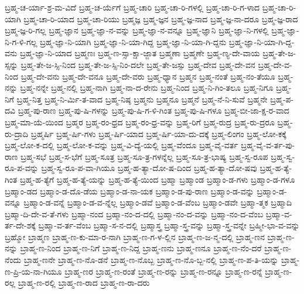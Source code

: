 {ಬ್ರಹ್ಮ-ಚ-ರ್ಯಾ-ಶ್ರ-ಮ-ವಿದೆ
ಬ್ರಹ್ಮ-ಚ-ರ್ಯೆಗೆ
ಬ್ರಹ್ಮ-ಚಾರಿ
ಬ್ರಹ್ಮ-ಚಾ-ರಿ-ಗಳಲ್ಲಿ
ಬ್ರಹ್ಮ-ಚಾ-ರಿ-ಗ-ಳಾದ
ಬ್ರಹ್ಮ-ಚಾ-ರಿ-ಯಾಗಿ
ಬ್ರಹ್ಮ-ಚಾ-ರಿ-ಯಾದ
ಬ್ರಹ್ಮ-ಚಾ-ರಿಯು
ಬ್ರಹ್ಮಜ್ಞ
ಬ್ರಹ್ಮ-ಜ್ಞನ
ಬ್ರಹ್ಮ-ಜ್ಞ-ನಾದ
ಬ್ರಹ್ಮ-ಜ್ಞ-ನಾ-ದರೂ
ಬ್ರಹ್ಮ-ಜ್ಞ-ರಾದ
ಬ್ರಹ್ಮ-ಜ್ಞ-ರಿ-ಗಲ್ಲ
ಬ್ರಹ್ಮ-ಜ್ಞಾನ
ಬ್ರಹ್ಮ-ಜ್ಞಾ-ನ-ವನ್ನು
ಬ್ರಹ್ಮ-ಜ್ಞಾ-ನ-ವನ್ನೂ
ಬ್ರಹ್ಮ-ಜ್ಞಾನಿ
ಬ್ರಹ್ಮ-ಜ್ಞಾ-ನಿ-ಗಳಲ್ಲಿ
ಬ್ರಹ್ಮ-ಜ್ಞಾ-ನಿ-ಗ-ಳಿ-ಗಲ್ಲ
ಬ್ರಹ್ಮ-ಜ್ಞಾ-ನಿ-ಯಾಗಿ
ಬ್ರಹ್ಮ-ಜ್ಞಾ-ನಿ-ಯಾ-ಗಿದ್ದ
ಬ್ರಹ್ಮ-ಜ್ಞಾ-ನಿ-ಯಾ-ಗಿ-ದ್ದನು
ಬ್ರಹ್ಮ-ಜ್ಞಾ-ನಿ-ಯಾ-ಗಿ-ದ್ದ-ವನು
ಬ್ರಹ್ಮ-ಜ್ಞಾ-ನಿ-ಯಾದ
ಬ್ರಹ್ಮಣಃ
ಬ್ರಹ್ಮ-ಣ-ಸ್ಸಾ-ಕ್ಷಾ-ಜ್ಜಾತ
ಬ್ರಹ್ಮಣಾ
ಬ್ರಹ್ಮಣೇ
ಬ್ರಹ್ಮ-ಣ್ಯ-ದೇ-ವಾಯ
ಬ್ರಹ್ಮ-ತೇ-ಜ-ಸ್ಸನ್ನು
ಬ್ರಹ್ಮ-ತೇ-ಜ-ಸ್ಸಿ-ನಿಂದ
ಬ್ರಹ್ಮ-ತೇ-ಜ-ಸ್ಸಿ-ನಿಂ-ದಲೇ
ಬ್ರಹ್ಮ-ತೇ-ಜಸ್ಸು
ಬ್ರಹ್ಮ-ದೇವ
ಬ್ರಹ್ಮ-ದೇ-ವನ
ಬ್ರಹ್ಮ-ದೇ-ವ-ನಿಂದ
ಬ್ರಹ್ಮ-ದೇ-ವನು
ಬ್ರಹ್ಮ-ದೇ-ವನೂ
ಬ್ರಹ್ಮ-ದೇ-ವರು
ಬ್ರಹ್ಮ-ಧ್ಯಾನ
ಬ್ರಹ್ಮನ
ಬ್ರಹ್ಮ-ನಂತೆ
ಬ್ರಹ್ಮ-ನಂ-ತೆಯೂ
ಬ್ರಹ್ಮ-ನನ್ನು
ಬ್ರಹ್ಮ-ನನ್ನೇ
ಬ್ರಹ್ಮ-ನಲ್ಲಿ
ಬ್ರಹ್ಮ-ನಾಗಿ
ಬ್ರಹ್ಮ-ನಾ-ದ-ರೇನು
ಬ್ರಹ್ಮ-ನಿಂದ
ಬ್ರಹ್ಮ-ನಿ-ಗಿಂ-ತಲೂ
ಬ್ರಹ್ಮ-ನಿಗೂ
ಬ್ರಹ್ಮ-ನಿಗೆ
ಬ್ರಹ್ಮ-ನಿತ್ತ
ಬ್ರಹ್ಮ-ನಿ-ರ್ಮಿ-ತ-ವಾದ
ಬ್ರಹ್ಮ-ನಿಷ್ಠ
ಬ್ರಹ್ಮನು
ಬ್ರಹ್ಮನೂ
ಬ್ರಹ್ಮನೆ
ಬ್ರಹ್ಮ-ನೆ-ನಿ-ಸುವೆ
ಬ್ರಹ್ಮನೇ
ಬ್ರಹ್ಮ-ಪ-ದವಿ
ಬ್ರಹ್ಮ-ಪು-ರಾಣ
ಬ್ರಹ್ಮ-ಪು-ಷಿ-ಗಳನ್ನು
ಬ್ರಹ್ಮ-ಪು-ಷಿ-ಗ-ಳಿ-ಗಿಂತ
ಬ್ರಹ್ಮ-ಪು-ಷಿ-ಗಳೂ
ಬ್ರಹ್ಮ-ಬೀ-ಜಾ-ಕ್ಷ-ರ-ವಾದ
ಬ್ರಹ್ಮ-ಮಾ-ಯೆ-ಯಿಂದ
ಬ್ರಹ್ಮರ
ಬ್ರಹ್ಮ-ರಂ-ಧ್ರದ
ಬ್ರಹ್ಮ-ರಂ-ಧ್ರ-ವನ್ನು
ಬ್ರಹ್ಮ-ರಿಗೆ
ಬ್ರಹ್ಮ-ರುದ್ರ
ಬ್ರಹ್ಮ-ರು-ದ್ರರೂ
ಬ್ರಹ್ಮ-ರು-ದ್ರಾದಿ
ಬ್ರಹ್ಮರ್ಷಿ
ಬ್ರಹ್ಮ-ರ್ಷಿ-ಗಳು
ಬ್ರಹ್ಮ-ರ್ಷಿ-ಯಾದ
ಬ್ರಹ್ಮ-ರ್ಷಿ-ಯಾ-ದು-ದಕ್ಕೆ
ಬ್ರಹ್ಮ-ಲಿಂಗಂ
ಬ್ರಹ್ಮ-ಲೋ-ಕಕ್ಕೆ
ಬ್ರಹ್ಮ-ಲೋ-ಕ-ದಲ್ಲಿ
ಬ್ರಹ್ಮ-ಲೋ-ಕ-ವನ್ನು
ಬ್ರಹ್ಮ-ವಿ-ದ್ಯೆ-ಯಲ್ಲಿ
ಬ್ರಹ್ಮ-ವೆಂದೂ
ಬ್ರಹ್ಮ-ವೈ-ವರ್ತ
ಬ್ರಹ್ಮ-ವೈ-ವ-ರ್ತ-ಪು-ರಾಣ
ಬ್ರಹ್ಮ-ಸಭೆ
ಬ್ರಹ್ಮ-ಸ-ಭೆಗೆ
ಬ್ರಹ್ಮ-ಸೂತ್ರ
ಬ್ರಹ್ಮ-ಸೂ-ತ್ರ-ಗಳನ್ನೆಲ್ಲ
ಬ್ರಹ್ಮ-ಸೂ-ತ್ರ-ಭಾಷ್ಯ
ಬ್ರಹ್ಮ-ಸ್ವ-ರೂಪ
ಬ್ರಹ್ಮ-ಸ್ವ-ರೂ-ಪ-ವನ್ನು
ಬ್ರಹ್ಮ-ಸ್ವ-ರೂ-ಪ-ವಾ-ಗಿಯೂ
ಬ್ರಹ್ಮ-ಹ-ತ್ಯಾ-ದೋ-ಷ-ದಿಂದ
ಬ್ರಹ್ಮ-ಹ-ತ್ಯಾ-ದೋ-ಷವು
ಬ್ರಹ್ಮ-ಹ-ತ್ಯೆ-ಗಿಂತ
ಬ್ರಹ್ಮ-ಹ-ತ್ಯೆಗೆ
ಬ್ರಹ್ಮ-ಹ-ತ್ಯೆ-ಯನ್ನು
ಬ್ರಹ್ಮ-ಹ-ತ್ಯೆ-ಯಿಂದ
ಬ್ರಹ್ಮಾ
ಬ್ರಹ್ಮಾಂಡ
ಬ್ರಹ್ಮಾಂ-ಡ-ಗಳು
ಬ್ರಹ್ಮಾಂ-ಡ-ಗಳೂ
ಬ್ರಹ್ಮಾಂ-ಡದ
ಬ್ರಹ್ಮಾಂ-ಡ-ದೊ-ಡೆಯ
ಬ್ರಹ್ಮಾಂ-ಡ-ನಾ-ಯಕ
ಬ್ರಹ್ಮಾಂ-ಡ-ಪು-ರಾಣ
ಬ್ರಹ್ಮಾಂ-ಡ-ವನ್ನು
ಬ್ರಹ್ಮಾಂ-ಡ-ವನ್ನೂ
ಬ್ರಹ್ಮಾಂ-ಡ-ವನ್ನೆ
ಬ್ರಹ್ಮಾಂ-ಡ-ವ-ನ್ನೆಲ್ಲ
ಬ್ರಹ್ಮಾಂ-ಡವೆ
ಬ್ರಹ್ಮಾಂ-ಡ-ವೆಂಬ
ಬ್ರಹ್ಮಾಂ-ಡವೇ
ಬ್ರಹ್ಮಾ-ತ್ಮಕ
ಬ್ರಹ್ಮಾದಿ
ಬ್ರಹ್ಮಾ-ದಿ-ದೇ-ವ-ತೆ-ಗಳು
ಬ್ರಹ್ಮಾ-ನಂದ
ಬ್ರಹ್ಮಾ-ನಂ-ದ-ದಲ್ಲಿ
ಬ್ರಹ್ಮಾ-ನಂ-ದ-ವನ್ನು
ಬ್ರಹ್ಮಾ-ನಂ-ದ-ವೆಂಬ
ಬ್ರಹ್ಮಾ-ವ-ರ್ತ-ದೇ-ಶಕ್ಕೆ
ಬ್ರಹ್ಮಾ-ವ-ರ್ತ-ವೆಂಬ
ಬ್ರಹ್ಮಾ-ಸ-ನ-ದಲ್ಲಿ
ಬ್ರಹ್ಮಾಸ್ತ್ರ
ಬ್ರಹ್ಮಾ-ಸ್ತ್ರ-ವನ್ನು
ಬ್ರಹ್ಮಾ-ಸ್ತ್ರ-ವನ್ನೇ
ಬ್ರಹ್ಮೀ-ಭಾ-ವ-ವನ್ನು
ಬ್ರಹ್ಮೋ
ಬ್ರಾಹ್ಮಣ
ಬ್ರಾಹ್ಮ-ಣ-ಕು-ಮಾ-ರ-ನಾಗಿ
ಬ್ರಾಹ್ಮ-ಣ-ಗ-ಳ-ಲ್ಲಿನ
ಬ್ರಾಹ್ಮ-ಣ-ಜ-ನ್ಮ-ದಲ್ಲಿ
ಬ್ರಾಹ್ಮ-ಣನ
ಬ್ರಾಹ್ಮ-ಣ-ನನ್ನು
ಬ್ರಾಹ್ಮ-ಣ-ನಿಂದ
ಬ್ರಾಹ್ಮ-ಣ-ನಿಗೆ
ಬ್ರಾಹ್ಮ-ಣ-ನಿದ್ದ
ಬ್ರಾಹ್ಮ-ಣನು
ಬ್ರಾಹ್ಮ-ಣನೂ
ಬ್ರಾಹ್ಮ-ಣ-ನೆಂ-ದರೆ
ಬ್ರಾಹ್ಮ-ಣ-ನೆಂದು
ಬ್ರಾಹ್ಮ-ಣನೇ
ಬ್ರಾಹ್ಮ-ಣ-ನೊ-ಡನೆ
ಬ್ರಾಹ್ಮ-ಣ-ನೊಬ್ಬ
ಬ್ರಾಹ್ಮ-ಣ-ನೊ-ಬ್ಬ-ನಲ್ಲಿ
ಬ್ರಾಹ್ಮ-ಣ-ಪ-ತಿ-ಯನ್ನು
ಬ್ರಾಹ್ಮ-ಣ-ಪ್ರಿ-ಯ-ನಾ-ಗಿಯೂ
ಬ್ರಾಹ್ಮ-ಣರ
ಬ್ರಾಹ್ಮ-ಣ-ರಂತೆ
ಬ್ರಾಹ್ಮ-ಣ-ರನ್ನು
ಬ್ರಾಹ್ಮ-ಣ-ರನ್ನೂ
ಬ್ರಾಹ್ಮ-ಣ-ರನ್ನೆ
ಬ್ರಾಹ್ಮ-ಣ-ರಲ್ಲ
ಬ್ರಾಹ್ಮ-ಣ-ರಲ್ಲಿ
ಬ್ರಾಹ್ಮ-ಣ-ರಾದ
ಬ್ರಾಹ್ಮ-ಣ-ರಾ-ದರು
}
